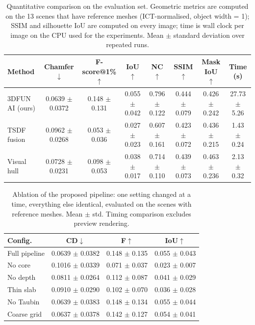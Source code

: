 \begin{table}[t]
\centering
\caption{Quantitative comparison on the evaluation set. Geometric metrics are computed on the 13 scenes that have reference meshes (ICT-normalised, object width = 1); SSIM and silhouette IoU are computed on every image; time is wall clock per image on the CPU used for the experiments. Mean $\pm$ standard deviation over repeated runs.}
\label{tab:main}
\small\setlength{\tabcolsep}{2pt}
\begin{tabular}{lccccccc}
\toprule
Method & Chamfer $\downarrow$ & F-score@1\% $\uparrow$ & IoU $\uparrow$ & NC $\uparrow$ & SSIM $\uparrow$ & Mask IoU $\uparrow$ & Time (s) \\
\midrule
3DFUN AI (ours) & 0.0639 $\pm$ 0.0372 & 0.148 $\pm$ 0.131 & 0.055 $\pm$ 0.042 & 0.796 $\pm$ 0.122 & 0.444 $\pm$ 0.079 & 0.426 $\pm$ 0.242 & 27.73 $\pm$ 5.26 \\
TSDF fusion & 0.0962 $\pm$ 0.0268 & 0.053 $\pm$ 0.036 & 0.027 $\pm$ 0.023 & 0.607 $\pm$ 0.161 & 0.423 $\pm$ 0.072 & 0.436 $\pm$ 0.215 & 1.43 $\pm$ 0.24 \\
Visual hull & 0.0728 $\pm$ 0.0231 & 0.098 $\pm$ 0.053 & 0.038 $\pm$ 0.017 & 0.714 $\pm$ 0.110 & 0.439 $\pm$ 0.073 & 0.463 $\pm$ 0.236 & 2.13 $\pm$ 0.32 \\
\bottomrule
\end{tabular}
\end{table}

\begin{table}[t]
\centering
\caption{Ablation of the proposed pipeline: one setting changed at a time, everything else identical, evaluated on the scenes with reference meshes. Mean $\pm$ std. Timing comparison excludes preview rendering.}
\label{tab:ablation}
\small\setlength{\tabcolsep}{3pt}
\begin{tabular}{p{17mm}ccc}
\toprule
Config. & CD$\downarrow$ & F$\uparrow$ & IoU$\uparrow$ \\
\midrule
Full pipeline & 0.0639 $\pm$ 0.0382 & 0.148 $\pm$ 0.135 & 0.055 $\pm$ 0.043 \\
No core & 0.1016 $\pm$ 0.0339 & 0.071 $\pm$ 0.037 & 0.023 $\pm$ 0.007 \\
No depth & 0.0811 $\pm$ 0.0264 & 0.112 $\pm$ 0.087 & 0.041 $\pm$ 0.029 \\
Thin slab & 0.0910 $\pm$ 0.0290 & 0.102 $\pm$ 0.070 & 0.036 $\pm$ 0.028 \\
No Taubin & 0.0639 $\pm$ 0.0383 & 0.148 $\pm$ 0.134 & 0.055 $\pm$ 0.044 \\
Coarse grid & 0.0637 $\pm$ 0.0378 & 0.142 $\pm$ 0.127 & 0.054 $\pm$ 0.041 \\
\bottomrule
\end{tabular}
\end{table}


